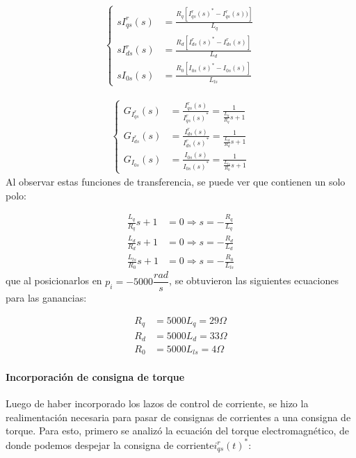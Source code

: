 \documentclass[a4paper, 10pt, onecolumn,journal]{ieeeconf}
\begin{document}
\begin{align}
	\begin{cases}
		s{I}^r_{qs}(s) &= \frac{ R_q \left[ {I^r_{qs}(s)}^* - I^r_{qs}(s))\right]}{L_q}\\
		s{I}^r_{ds}(s) &= \frac{R_d \left[ {I^r_{ds}(s)}^* - I^r_{ds}(s) \right]}{L_d} \\ 
		s{I}_{0s}(s)   &= \frac{R_0 \left[ {I_{0s}(s)}^* - I_{0s}(s) \right]}{L_{ls}}
	\end{cases}	\label{Ecuaciones Laplace lazos de control de corriente}
\end{align}

\begin{align}
	\begin{cases}
		G_{{I}^r_{qs}}(s) &=\frac{{I}^r_{qs}(s)}{{I^r_{qs}(s)}^*} =\frac{1}{\frac{L_q}{R_q} s + 1}\\
		G_{{I}^r_{ds}}(s) &=\frac{{I}^r_{ds}(s)}{{I^r_{ds}(s)}^*} = \frac{1}{\frac{L_d}{R_d} s + 1}\\ 
		G_{{I}_{0s}}(s)   &=\frac{{I}_{0s}(s)}{{I_{0s}(s)}^*} = \frac{1}{\frac{L_{ls}}{R_0} s + 1}
	\end{cases}	\label{Funciones de Transferencia de lazos de control de corriente}
\end{align}
Al observar estas funciones de transferencia, se puede ver que contienen un solo polo:

\begin{align}
	\frac{L_q}{R_q} s + 1 &= 0 \Rightarrow s = -\frac{R_q}{L_q}\\
	\frac{L_{d}}{R_d} s + 1 &=0 \Rightarrow s = -\frac{R_d}{L_d}\\ 
	\frac{L_{ls}}{R_0} s + 1  &=0 \Rightarrow s = -\frac{R_0}{L_{ls}}
\end{align}
que al posicionarlos en $p_{i}=-5000\dfrac{rad}{s}$, se obtuvieron las siguientes ecuaciones para las ganancias:

\begin{align}
	R_q &= 5000 L_q = 29 \Omega\\
	R_d &= 5000 L_d = 33 \Omega\\ 
	R_0 &= 5000 L_{ls} = 4 \Omega
\end{align}

\paragraph{\textbf{Incorporación de consigna de torque}}
Luego de haber incorporado los lazos de control de corriente, se hizo la realimentación necesaria para pasar de consignas de corrientes a una consigna de torque. Para esto, primero se analizó la ecuación del torque electromagnético, de donde podemos despejar la consigna de corriente${i^r_{qs}(t)}^*$:
\end{document}
